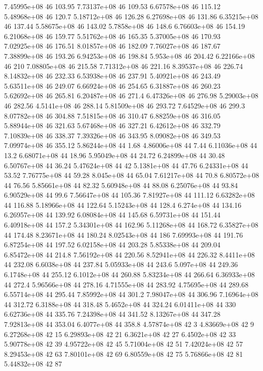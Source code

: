 7.45995e+08 46 103.95
7.73137e+08 46 109.53
6.67578e+08 46 115.12
5.48968e+08 46 120.7
5.18712e+08 46 126.28
6.27698e+08 46 131.86
6.35215e+08 46 137.44
5.58675e+08 46 143.02
5.7858e+08 46 148.6
6.76603e+08 46 154.19
6.21068e+08 46 159.77
5.51762e+08 46 165.35
5.37005e+08 46 170.93
7.02925e+08 46 176.51
8.01857e+08 46 182.09
7.76027e+08 46 187.67
7.38899e+08 46 193.26
6.94253e+08 46 198.84
5.953e+08 46 204.42
6.22166e+08 46 210
7.08805e+08 46 215.58
7.71312e+08 46 221.16
8.39537e+08 46 226.74
8.14832e+08 46 232.33
6.53938e+08 46 237.91
5.40921e+08 46 243.49
5.63511e+08 46 249.07
6.66924e+08 46 254.65
6.31887e+08 46 260.23
5.62692e+08 46 265.81
6.20487e+08 46 271.4
6.47326e+08 46 276.98
5.29003e+08 46 282.56
4.5141e+08 46 288.14
5.81509e+08 46 293.72
7.64529e+08 46 299.3
8.07782e+08 46 304.88
7.51815e+08 46 310.47
6.88259e+08 46 316.05
5.88944e+08 46 321.63
5.67468e+08 46 327.21
6.42612e+08 46 332.79
7.10839e+08 46 338.37
7.39326e+08 46 343.95
8.09082e+08 46 349.53
7.09974e+08 46 355.12
5.86244e+08 44 1.68
4.86006e+08 44 7.44
6.11036e+08 44 13.2
6.68071e+08 44 18.96
5.95049e+08 44 24.72
6.24899e+08 44 30.48
6.50767e+08 44 36.24
5.47624e+08 44 42
5.1381e+08 44 47.76
6.24331e+08 44 53.52
7.76775e+08 44 59.28
8.045e+08 44 65.04
7.61217e+08 44 70.8
6.80572e+08 44 76.56
5.85661e+08 44 82.32
5.60948e+08 44 88.08
6.25076e+08 44 93.84
6.90529e+08 44 99.6
7.56647e+08 44 105.36
7.81927e+08 44 111.12
6.63282e+08 44 116.88
5.18966e+08 44 122.64
5.15243e+08 44 128.4
6.274e+08 44 134.16
6.26957e+08 44 139.92
6.08084e+08 44 145.68
6.59731e+08 44 151.44
6.40918e+08 44 157.2
5.34301e+08 44 162.96
5.11268e+08 44 168.72
6.35827e+08 44 174.48
8.23671e+08 44 180.24
8.02543e+08 44 186
7.69993e+08 44 191.76
6.87254e+08 44 197.52
6.02158e+08 44 203.28
5.85338e+08 44 209.04
6.85472e+08 44 214.8
7.56192e+08 44 220.56
8.52941e+08 44 226.32
8.4411e+08 44 232.08
6.6038e+08 44 237.84
5.05933e+08 44 243.6
5.097e+08 44 249.36
6.1748e+08 44 255.12
6.1012e+08 44 260.88
5.83234e+08 44 266.64
6.36933e+08 44 272.4
5.96566e+08 44 278.16
4.71555e+08 44 283.92
4.75695e+08 44 289.68
6.55714e+08 44 295.44
7.85992e+08 44 301.2
7.98047e+08 44 306.96
7.16964e+08 44 312.72
6.3188e+08 44 318.48
5.4652e+08 44 324.24
6.01411e+08 44 330
6.62736e+08 44 335.76
7.24398e+08 44 341.52
8.13267e+08 44 347.28
7.92813e+08 44 353.04
6.4077e+08 44 358.8
4.57874e+08 42 3
4.83669e+08 42 9
6.27268e+08 42 15
6.29893e+08 42 21
6.3621e+08 42 27
6.4502e+08 42 33
5.90778e+08 42 39
4.95722e+08 42 45
5.71004e+08 42 51
7.42024e+08 42 57
8.29453e+08 42 63
7.80101e+08 42 69
6.80559e+08 42 75
5.76866e+08 42 81
5.44832e+08 42 87
